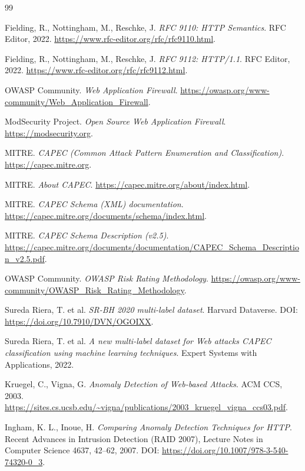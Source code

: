 \documentclass[12pt,oneside]{report}
\begin{document}
\begin{thebibliography}{99}

Fielding, R., Nottingham, M., Reschke, J. \emph{RFC 9110: HTTP Semantics}. RFC Editor, 2022. \url{https://www.rfc-editor.org/rfc/rfc9110.html}.

Fielding, R., Nottingham, M., Reschke, J. \emph{RFC 9112: HTTP/1.1}. RFC Editor, 2022. \url{https://www.rfc-editor.org/rfc/rfc9112.html}.



OWASP Community. \emph{Web Application Firewall}. \url{https://owasp.org/www-community/Web_Application_Firewall}.

ModSecurity Project. \emph{Open Source Web Application Firewall}. \url{https://modsecurity.org}.

MITRE. \emph{CAPEC (Common Attack Pattern Enumeration and Classification)}. \url{https://capec.mitre.org}.

MITRE. \emph{About CAPEC}. \url{https://capec.mitre.org/about/index.html}.

MITRE. \emph{CAPEC Schema (XML) documentation}. \url{https://capec.mitre.org/documents/schema/index.html}.

MITRE. \emph{CAPEC Schema Description (v2.5)}. \url{https://capec.mitre.org/documents/documentation/CAPEC_Schema_Description_v2.5.pdf}.

OWASP Community. \emph{OWASP Risk Rating Methodology}. \url{https://owasp.org/www-community/OWASP_Risk_Rating_Methodology}.

Sureda Riera, T. et al. \emph{SR-BH 2020 multi-label dataset}. Harvard Dataverse.
DOI: \url{https://doi.org/10.7910/DVN/OGOIXX}.

Sureda Riera, T. et al. \emph{A new multi-label dataset for Web attacks CAPEC classification using machine learning techniques}.
Expert Systems with Applications, 2022.

Kruegel, C., Vigna, G. \emph{Anomaly Detection of Web-based Attacks}. ACM CCS, 2003.
\url{https://sites.cs.ucsb.edu/~vigna/publications/2003_kruegel_vigna_ccs03.pdf}.

Ingham, K. L., Inoue, H.
\emph{Comparing Anomaly Detection Techniques for HTTP}.
Recent Advances in Intrusion Detection (RAID 2007), Lecture Notes in Computer Science 4637, 42--62, 2007. DOI: \url{https://doi.org/10.1007/978-3-540-74320-0_3}.


\end{thebibliography}
\end{document}
